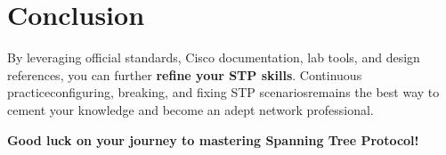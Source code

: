 \documentclass[a4paper]{report}
\begin{document}
\section{Conclusion}
By leveraging official standards, Cisco documentation, lab tools, and design references, you can further \textbf{refine your STP skills}. Continuous practice\textemdash configuring, breaking, and fixing STP scenarios\textemdash remains the best way to cement your knowledge and become an adept network professional.

\textbf{Good luck on your journey to mastering Spanning Tree Protocol!}


\end{document}
